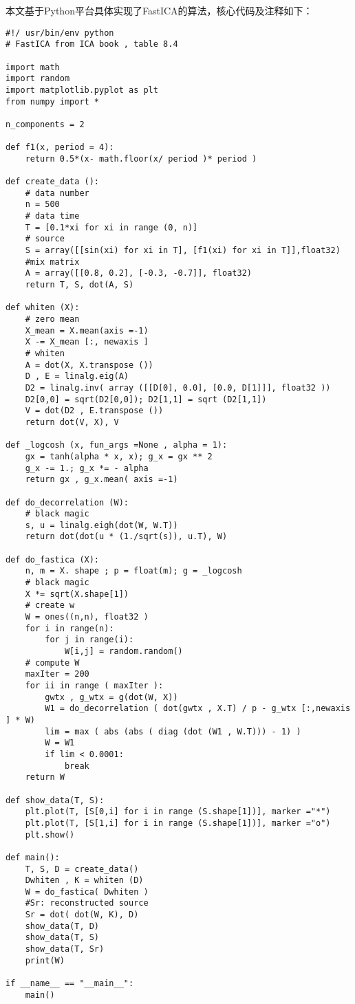 本文基于Python平台具体实现了FastICA的算法，核心代码及注释如下：

\begin{verbatim}
#!/ usr/bin/env python
# FastICA from ICA book , table 8.4

import math
import random
import matplotlib.pyplot as plt
from numpy import *

n_components = 2

def f1(x, period = 4):
    return 0.5*(x- math.floor(x/ period )* period )

def create_data ():
    # data number
    n = 500
    # data time
    T = [0.1*xi for xi in range (0, n)]
    # source
    S = array([[sin(xi) for xi in T], [f1(xi) for xi in T]],float32)
    #mix matrix
    A = array([[0.8, 0.2], [-0.3, -0.7]], float32)
    return T, S, dot(A, S)

def whiten (X):
    # zero mean
    X_mean = X.mean(axis =-1)
    X -= X_mean [:, newaxis ]
    # whiten
    A = dot(X, X.transpose ())
    D , E = linalg.eig(A)
    D2 = linalg.inv( array ([[D[0], 0.0], [0.0, D[1]]], float32 ))
    D2[0,0] = sqrt(D2[0,0]); D2[1,1] = sqrt (D2[1,1])
    V = dot(D2 , E.transpose ())
    return dot(V, X), V

def _logcosh (x, fun_args =None , alpha = 1):
    gx = tanh(alpha * x, x); g_x = gx ** 2
    g_x -= 1.; g_x *= - alpha
    return gx , g_x.mean( axis =-1)

def do_decorrelation (W):
    # black magic
    s, u = linalg.eigh(dot(W, W.T))
    return dot(dot(u * (1./sqrt(s)), u.T), W)

def do_fastica (X):
    n, m = X. shape ; p = float(m); g = _logcosh
    # black magic
    X *= sqrt(X.shape[1])
    # create w
    W = ones((n,n), float32 )
    for i in range(n):
        for j in range(i):
            W[i,j] = random.random()
    # compute W
    maxIter = 200
    for ii in range ( maxIter ):
        gwtx , g_wtx = g(dot(W, X))
        W1 = do_decorrelation ( dot(gwtx , X.T) / p - g_wtx [:,newaxis ] * W)
        lim = max ( abs (abs ( diag (dot (W1 , W.T))) - 1) )
        W = W1
        if lim < 0.0001:
            break
    return W

def show_data(T, S):
    plt.plot(T, [S[0,i] for i in range (S.shape[1])], marker ="*")
    plt.plot(T, [S[1,i] for i in range (S.shape[1])], marker ="o")
    plt.show()

def main():
    T, S, D = create_data()
    Dwhiten , K = whiten (D)
    W = do_fastica( Dwhiten )
    #Sr: reconstructed source
    Sr = dot( dot(W, K), D)
    show_data(T, D)
    show_data(T, S)
    show_data(T, Sr)
    print(W)

if __name__ == "__main__":
    main()
\end{verbatim}